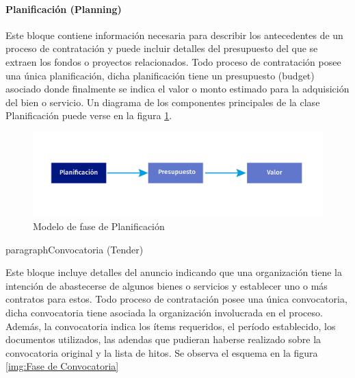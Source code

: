 \paragraph{Planificación (Planning)}

Este bloque contiene información necesaria para describir los antecedentes de un proceso de contratación y puede incluir detalles del presupuesto del que se extraen los fondos o proyectos relacionados. Todo proceso de contratación posee una única planificación, dicha planificación tiene un presupuesto (budget) asociado donde finalmente se indica el valor o monto estimado para la adquisición del bien o servicio. Un diagrama de los componentes principales de la clase Planificación puede verse en la figura \ref{img:Fase de Planificacion}.

\begin{figure}[htbp!]
    \centering
    \includegraphics[width=150mm]{figuras/Diagramas_Planificacion.png}
    \caption{Modelo de fase de Planificación}
    \label{img:Fase de Planificacion}
\end{figure}

paragraph{Convocatoria (Tender)}

Este bloque incluye detalles del anuncio indicando que una organización tiene la intención de abastecerse de algunos bienes o servicios y establecer uno o más contratos para estos. Todo proceso de contratación posee una única convocatoria, dicha convocatoria tiene asociada la organización involucrada en el proceso. Además, la convocatoria indica los ítems requeridos, el período establecido, los documentos utilizados, las adendas que pudieran haberse realizado sobre la convocatoria original y la lista de hitos. Se observa el esquema en la figura \ref{img:Fase de Convocatoria}

